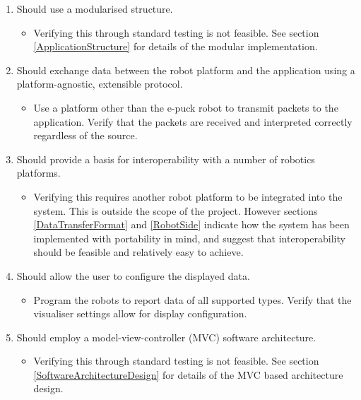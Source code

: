 \begin{enumerate}[label=S\arabic*.]
 \item Should use a modularised structure.
 \begin{itemize}
  \item Verifying this through standard testing is not feasible. See section \ref{ApplicationStructure} for details of the modular implementation.
 \end{itemize}
 
 \item Should exchange data between the robot platform and the application using a platform-agnostic, extensible protocol.
 \begin{itemize}
  \item Use a platform other than the e-puck robot to transmit packets to the application. Verify that the packets are received and interpreted correctly regardless of the source.
 \end{itemize}
 
 \item Should provide a basis for interoperability with a number of robotics platforms.
 \begin{itemize}
  \item Verifying this requires another robot platform to be integrated into the system. This is outside the scope of the project. However sections \ref{DataTransferFormat} and \ref{RobotSide} indicate how the system has been implemented with portability in mind, and suggest that interoperability should be feasible and relatively easy to achieve.
 \end{itemize}
 
 \item Should allow the user to configure the displayed data.
 \begin{itemize}
  \item Program the robots to report data of all supported types. Verify that the visualiser settings allow for display configuration.
 \end{itemize}
 
 \item Should employ a model-view-controller (MVC) software architecture.
 \begin{itemize}
  \item Verifying this through standard testing is not feasible. See section \ref{SoftwareArchitectureDesign} for details of the MVC based architecture design.
 \end{itemize}
 

\end{enumerate}
